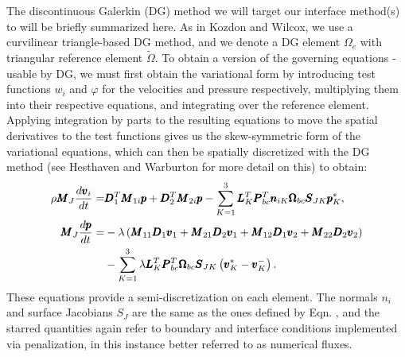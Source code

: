 The discontinuous Galerkin (DG) method we will target our interface method(s) to
will be briefly summarized here. As in Kozdon and Wilcox, we use a curvilinear
triangle-based DG method, and we denote a DG element $\Omega_e$ with triangular
reference element $\tilde{\Omega}$. To obtain a version of the governing equations
 -  usable by DG, we must first obtain the variational
form by introducing test functions $w_{i}$ and $\varphi$ for the velocities and pressure
respectively, multiplying them into their respective equations, and integrating over
the reference element. Applying integration by parts to the resulting equations to move
the spatial derivatives to the test functions gives us the skew-symmetric form of the
variational equations, which can then be spatially discretized with the DG method 
(see Hesthaven and Warburton \cite{hesthaven2007nodal} for more detail on this) to obtain:
\begin{align}
  \rho \pmb{M}_{J} \frac{d \pmb{v}_{i}}{dt} =&
  \pmb{D}_{1}^{T} \pmb{M}_{1i} \pmb{p}
  + \pmb{D}_{2}^{T} \pmb{M}_{2i} \pmb{p}
  - \sum_{K=1}^{3} \pmb{L}_{K}^{T} \pmb{P}_{bc}^{T} \pmb{n}_{iK}
  \pmb{\Omega}_{bc} \pmb{S}_{JK} \pmb{p}_{K}^{*},\\
  \notag
  \pmb{M}_{J} \frac{d\pmb{p}}{dt} =&
  -\lambda\left(
  \pmb{M}_{11} \pmb{D}_{1} \pmb{v}_{1}
    +
    \pmb{M}_{21} \pmb{D}_{2} \pmb{v}_{1}
    +
    \pmb{M}_{12} \pmb{D}_{1} \pmb{v}_{2}
    +
    \pmb{M}_{22} \pmb{D}_{2} \pmb{v}_{2}
  \right)\\
  &- \sum_{K=1}^{3}\lambda \pmb{L}_{K}^{T} \pmb{P}_{bc}^{T} \pmb{\Omega}_{bc}
  \pmb{S}_{JK} \left(\pmb{v}_{K}^* - \pmb{v}_{K}^{-}\right).
\end{align}
These equations provide a semi-discretization on each element.
The normals $n_{i}$ and surface Jacobians $S_{J}$ are the same
as the ones defined by Eqn. , and the starred
quantities again refer to boundary and interface conditions implemented via penalization,
in this instance better referred to as numerical fluxes.
